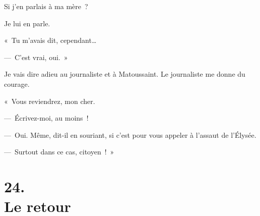 \documentclass[french,twoside]{book} %
\begin{document}
Si j’en parlais à ma mère ?\par
\bigbreak
\noindent Je lui en parle.\par
« Tu m’avais dit, cependant…\par
— C’est vrai, oui. »\par
Je vais dire adieu au journaliste et à Matoussaint. Le journaliste me donne du courage.\par
« Vous reviendrez, mon cher.\par
— Écrivez-moi, au moins !\par
— Oui. Même, dit-il en souriant, si c’est pour vous appeler à l’assaut de l’Élysée.\par
— Surtout dans ce cas, citoyen ! »
\section[{24. Le retour}]{24. \\
Le retour}\renewcommand{\leftmark}{24. \\
Le retour}
\end{document}
